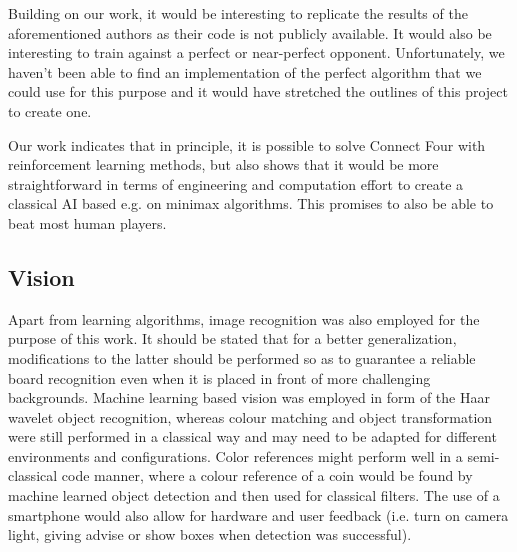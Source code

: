 \documentclass[10pt,twocolumn,letterpaper]{article}
\begin{document}
Building on our work, it would be interesting to replicate the results of the aforementioned
authors as their code is not publicly available.
It would also be interesting to train against a perfect or near-perfect opponent.
Unfortunately, we haven't been able to find an implementation of the perfect algorithm that we could use for this purpose and it would have stretched the outlines of this project to create one.

Our work indicates that in principle, it is possible to solve Connect Four with
reinforcement learning methods, but also shows that it would be more straightforward in terms of engineering and computation effort to create a classical AI based e.g. on minimax algorithms. This promises to also be able to beat most human players.

\subsection{Vision}
Apart from learning algorithms, image recognition was also employed for the purpose of this work. It should be stated that for a better generalization, modifications to the latter should be performed so as to guarantee a reliable board recognition even when it is placed in front of more challenging backgrounds.
Machine learning based vision was employed in form of the Haar wavelet object recognition, whereas colour matching and object transformation were still performed in a classical way and may need to be adapted for different environments and configurations.
Color references might perform well in a semi-classical code manner, where a colour reference of a coin would be found by machine learned object detection and then used for classical filters.
The use of a smartphone would also allow for hardware and user feedback (i.e. turn on camera light, giving advise or show boxes when detection was successful).
\end{document}
